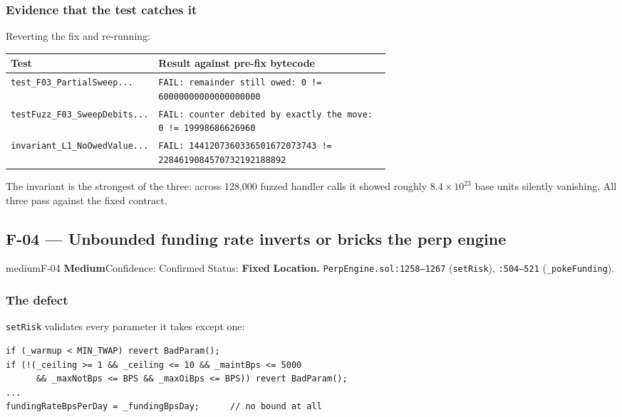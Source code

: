 \documentclass[11pt,a4paper]{article}
\newcommand{\code}[1]{\texttt{\small #1}}
\newcommand{\fileref}[1]{\texttt{\scriptsize #1}}
\begin{document}
\subsubsection*{Evidence that the test catches it}

Reverting the fix and re-running:
\begin{center}\small
\begin{tabular}{@{}lp{0.62\linewidth}@{}}
\toprule
\textbf{Test} & \textbf{Result against pre-fix bytecode} \\
\midrule
\code{test\_F03\_PartialSweep...} & \code{FAIL: remainder still owed: 0 != 60000000000000000000} \\
\code{testFuzz\_F03\_SweepDebits...} & \code{FAIL: counter debited by exactly the move: 0 != 19998686626960} \\
\code{invariant\_L1\_NoOwedValue...} & \code{FAIL: 1441207360336501672073743 != 2284619084570732192188892} \\
\bottomrule
\end{tabular}
\end{center}
The invariant is the strongest of the three: across 128{,}000 fuzzed handler calls
it showed roughly $8.4\times10^{23}$ base units silently vanishing. All three pass
against the fixed contract.

\newpage
\subsection{F-04 --- Unbounded funding rate inverts or bricks the perp engine}

\begin{findingbox}{medium}{F-04 \quad \textbf{Medium}\quad Confidence: Confirmed \quad Status: \textbf{Fixed}}
\textbf{Location.} \fileref{PerpEngine.sol:1258--1267} (\code{setRisk}),
\fileref{:504--521} (\code{\_pokeFunding}).
\end{findingbox}

\subsubsection*{The defect}

\code{setRisk} validates every parameter it takes except one:

\begin{lstlisting}
if (_warmup < MIN_TWAP) revert BadParam();
if (!(_ceiling >= 1 && _ceiling <= 10 && _maintBps <= 5000
      && _maxNotBps <= BPS && _maxOiBps <= BPS)) revert BadParam();
...
fundingRateBpsPerDay = _fundingBpsDay;      // no bound at all
\end{lstlisting}
\end{document}
